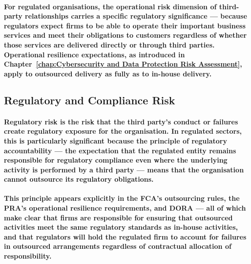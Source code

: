 \paragraph{For regulated organisations, the operational risk dimension of third-party relationships carries a specific regulatory significance — because regulators expect firms to be able to operate their important business services and meet their obligations to customers regardless of whether those services are delivered directly or through third parties. Operational resilience expectations, as introduced in Chapter~\ref{chap:Cybersecurity and Data Protection Risk Assessment}, apply to outsourced delivery as fully as to in-house delivery.}

\subsection{Regulatory and Compliance Risk}
\paragraph{\textbf{Regulatory risk} is the risk that the third party's conduct or failures create regulatory exposure for the organisation. In regulated sectors, this is particularly significant because the principle of \textbf{regulatory accountability} — the expectation that the regulated entity remains responsible for regulatory compliance even where the underlying activity is performed by a third party — means that the organisation cannot outsource its regulatory obligations.}
\paragraph{This principle appears explicitly in the FCA's outsourcing rules, the PRA's operational resilience requirements, and DORA — all of which make clear that firms are responsible for ensuring that outsourced activities meet the same regulatory standards as in-house activities, and that regulators will hold the regulated firm to account for failures in outsourced arrangements regardless of contractual allocation of responsibility.}
